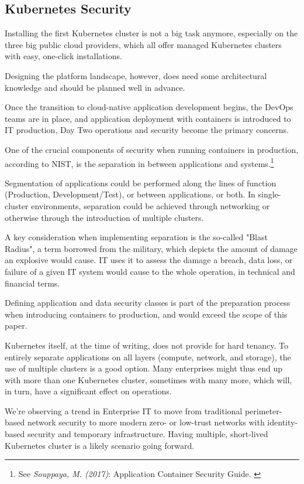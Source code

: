 \subsection{Kubernetes Security}

Installing the first Kubernetes cluster is not a big task anymore, especially on the three big public cloud providers, which all offer managed Kubernetes clusters with easy, one-click installations.

Designing the platform landscape, however, does need some architectural knowledge and should be planned well in advance.

Once the transition to cloud-native application development begins, the DevOps teams are in place, and application deployment with containers is introduced to IT production, Day Two operations and security become the primary concerns.

One of the crucial components of security when running containers in production, according to NIST, is the separation in between applications and systems.\footnote{See \textit{Souppaya, M. (2017)}: Application Container Security Guide. \cite{sp800-190}}

Segmentation of applications could be performed along the lines of function (Production, Development/Test), or between applications, or both. In single-cluster environments, separation could be achieved through networking or otherwise through the introduction of multiple clusters. 

A key consideration when implementing separation is the so-called "Blast Radius", a term borrowed from the military, which depicts the amount of damage an explosive would cause. IT uses it to assess the damage a breach, data loss, or failure of a given IT system would cause to the whole operation, in technical and financial terms.

Defining application and data security classes is part of the preparation process when introducing containers to production, and would exceed the scope of this paper.

Kubernetes itself, at the time of writing, does not provide for hard tenancy. To entirely separate applications on all layers (compute, network, and storage), the use of multiple clusters is a good option. Many enterprises might thus end up with more than one Kubernetes cluster, sometimes with many more, which will, in turn, have a significant effect on operations.

We're observing a trend in Enterprise IT to move from traditional perimeter-based network security to more modern zero- or low-trust networks with identity-based security and temporary infrastructure. Having multiple, short-lived Kubernetes cluster is a likely scenario going forward.

